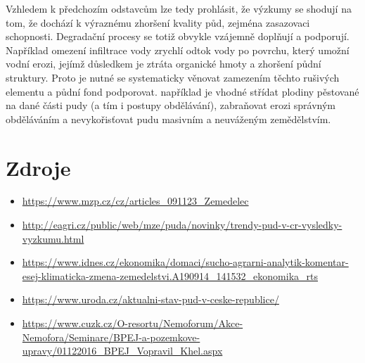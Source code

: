 \documentclass[a4paper]{article}
\begin{document}
Vzhledem k předchozím odstavcům lze tedy prohlásit, že výzkumy se shodují na tom, že dochází k výraznému zhoršení kvality půd, zejména zasazovaci schopnosti.
Degradační procesy se totiž obvykle vzájemně doplňují a podporují.
Například omezení infiltrace vody zrychlí odtok vody po povrchu, který umožní vodní erozi, jejímž důsledkem je ztráta organické hmoty a zhoršení půdní struktury.
Proto je nutné se systematicky věnovat zamezením těchto rušivých elementu a půdní fond podporovat.
například je vhodné střídat plodiny pěstované na dané části pudy (a tím i postupy obdělávání), zabraňovat erozi správným obděláváním a nevykořisťovat pudu masivním a neuváženým zemědělstvím.

\section*{Zdroje}


\begin{itemize}
	\item 
\url{https://www.mzp.cz/cz/articles_091123_Zemedelec}
\item
\url{http://eagri.cz/public/web/mze/puda/novinky/trendy-pud-v-cr-vysledky-vyzkumu.html}
\item
\url{https://www.idnes.cz/ekonomika/domaci/sucho-agrarni-analytik-komentar-esej-klimaticka-zmena-zemedelstvi.A190914_141532_ekonomika_rts}
\item
\url{https://www.uroda.cz/aktualni-stav-pud-v-ceske-republice/}
\item\url{https://www.cuzk.cz/O-resortu/Nemoforum/Akce-Nemofora/Seminare/BPEJ-a-pozemkove-upravy/01122016_BPEJ_Vopravil_Khel.aspx}
\end{itemize}
\end{document}

